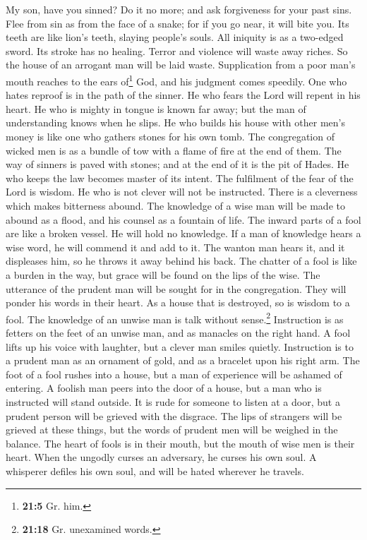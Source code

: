  My son, have you sinned? Do it no more; and ask
forgiveness for your past sins.  Flee from sin as from the
face of a snake; for if you go near, it will bite you. Its teeth are
like lion's teeth, slaying people's souls.  All iniquity
is as a two-edged sword. Its stroke has no healing. 
Terror and violence will waste away riches. So the house of an arrogant
man will be laid waste.  Supplication from a poor man's
mouth reaches to the ears of\footnote{\textbf{21:5} Gr. him.} God, and
his judgment comes speedily.  One who hates reproof is in
the path of the sinner. He who fears the Lord will repent in his heart.
 He who is mighty in tongue is known far away; but the man
of understanding knows when he slips.  He who builds his
house with other men's money is like one who gathers stones for his own
tomb.  The congregation of wicked men is as a bundle of
tow with a flame of fire at the end of them.  The way of
sinners is paved with stones; and at the end of it is the pit of Hades.
 He who keeps the law becomes master of its intent. The
fulfilment of the fear of the Lord is wisdom.  He who is
not clever will not be instructed. There is a cleverness which makes
bitterness abound.  The knowledge of a wise man will be
made to abound as a flood, and his counsel as a fountain of life.
 The inward parts of a fool are like a broken vessel. He
will hold no knowledge.  If a man of knowledge hears a
wise word, he will commend it and add to it. The wanton man hears it,
and it displeases him, so he throws it away behind his back.
 The chatter of a fool is like a burden in the way, but
grace will be found on the lips of the wise.  The
utterance of the prudent man will be sought for in the congregation.
They will ponder his words in their heart.  As a house
that is destroyed, so is wisdom to a fool. The knowledge of an unwise
man is talk without sense.\footnote{\textbf{21:18} Gr. unexamined words.}
 Instruction is as fetters on the feet of an unwise man,
and as manacles on the right hand.  A fool lifts up his
voice with laughter, but a clever man smiles quietly. 
Instruction is to a prudent man as an ornament of gold, and as a
bracelet upon his right arm.  The foot of a fool rushes
into a house, but a man of experience will be ashamed of entering.
 A foolish man peers into the door of a house, but a man
who is instructed will stand outside.  It is rude for
someone to listen at a door, but a prudent person will be grieved with
the disgrace.  The lips of strangers will be grieved at
these things, but the words of prudent men will be weighed in the
balance.  The heart of fools is in their mouth, but the
mouth of wise men is their heart.  When the ungodly
curses an adversary, he curses his own soul.  A whisperer
defiles his own soul, and will be hated wherever he travels.

